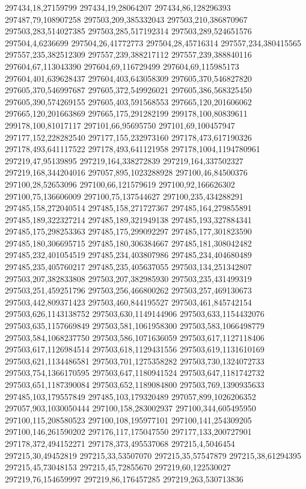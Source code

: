 297434,18,27159799
297434,19,28064207
297434,86,128296393
297487,79,108907258
297503,209,385332043
297503,210,386870967
297503,283,514027385
297503,285,517192314
297503,289,524651576
297504,4,6236699
297504,26,41772773
297504,28,45716314
297557,234,380415565
297557,235,382512309
297557,239,388217112
297557,239,388840116
297604,67,113043390
297604,69,116729499
297604,69,115985173
297604,401,639628437
297604,403,643058309
297605,370,546827820
297605,370,546997687
297605,372,549926021
297605,386,568325450
297605,390,574269155
297605,403,591568553
297665,120,201606062
297665,120,201663869
297665,175,291282199
299178,100,80839611
299178,100,81017117
297101,66,95695750
297101,69,100457947
297177,152,228282540
297177,155,232973160
297178,473,617190326
297178,493,641117522
297178,493,641121958
297178,1004,1194780961
297219,47,95139895
297219,164,338272839
297219,164,337502327
297219,168,344204016
297057,895,1023288928
297100,46,84500376
297100,28,52653096
297100,66,121579619
297100,92,166626302
297100,75,136606009
297100,75,137544627
297100,235,434288291
297485,158,272040514
297485,158,271727367
297485,164,279855891
297485,189,322327214
297485,189,321949138
297485,193,327884341
297485,175,298253363
297485,175,299092297
297485,177,301823590
297485,180,306695715
297485,180,306384667
297485,181,308042482
297485,232,401054519
297485,234,403807986
297485,234,404680489
297485,235,405760217
297485,235,405637055
297503,134,251342807
297503,207,382833808
297503,207,382985930
297503,235,431499319
297503,251,459251796
297503,256,466800262
297503,257,469130673
297503,442,809371423
297503,460,844195527
297503,461,845742154
297503,626,1143138752
297503,630,1149144906
297503,633,1154432076
297503,635,1157669849
297503,581,1061958300
297503,583,1066498779
297503,584,1068237750
297503,586,1071636059
297503,617,1127118406
297503,617,1126984514
297503,618,1129431556
297503,619,1131610169
297503,621,1134486581
297503,701,1275358282
297503,730,1324072733
297503,754,1366170595
297503,647,1180941524
297503,647,1181742732
297503,651,1187390084
297503,652,1189084800
297503,769,1390935633
297485,103,179557849
297485,103,179320489
297057,899,1026206352
297057,903,1030050444
297100,158,283002937
297100,344,605495950
297100,115,208580523
297100,108,195977101
297100,141,254309205
297100,146,261590202
297176,117,175047550
297177,133,200727901
297178,372,494152271
297178,373,495537068
297215,4,5046454
297215,30,49452819
297215,33,53507070
297215,35,57547879
297215,38,61294395
297215,45,73048153
297215,45,72855670
297219,60,122530027
297219,76,154659997
297219,86,176457285
297219,263,530713836
